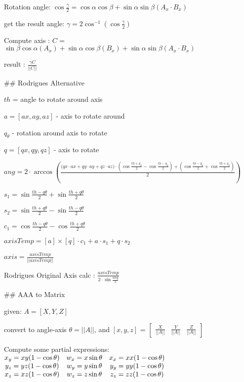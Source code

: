 Rotation angle: $\cos \frac{\gamma}{2} = \cos \alpha   \cos \beta  + \sin \alpha    \sin \beta  (  A_x \cdot B_x )$

get the result angle: $ \gamma = 2 \cos^{-1}( \cos \frac {\gamma}{2} )$


Compute axis : $C$ = $  \sin \beta  \cos \alpha  (A_x)  + \sin \alpha  \cos \beta (B_x) + \sin \alpha \sin \beta  ( A_x \cdot B_x ) $

result : $\frac {\gamma C} {||C||}$

## Rodrigues Alternative 

$th$ = angle to rotate around axis

$a = [ax,ay,az]$ - axis to rotate around

$q_{\theta}$ - rotation around axis to rotate

$ q = [qx,qy,qz]$ - axis to rotate

${ang} = 2 \cdot \arccos  ( \frac { ({{qx} \cdot {ax}+{qy}\cdot{ay}+{qz}\cdot{az})}\cdot({\cos {\frac {{th} + {q_\theta}} 2}}-{\cos {\frac {{th} - {q_\theta}} 2}}) + ( {\cos {\frac {{th} - {q_\theta}} 2}} + {\cos {\frac {{th} + {q_\theta}} 2}} ) } 2   )$

${s_1} = {\sin {\frac {{th} - {q\theta}} 2}} + {\sin {\frac {{th} + {q\theta}} 2}} $

${s_2} = {\sin {\frac {{th} + {q\theta}} 2}} - {\sin {\frac {{th} - {q\theta}} 2}} $

${c_1} = {\cos {\frac {{th} - {q\theta}} 2}} - {\cos {\frac {{th} + {q\theta}} 2}} $

${axisTemp} = {[{a}] \times [{q}]}\cdot {c_1} + {a}\cdot{s_1} + {q}\cdot{s_2} $

${axis} = \frac {axisTemp} { ||{axisTemp}|| } $

Rodrigues Original Axis calc : $\frac {axisTemp} {2 \cdot \sin  \frac {ang} 2 } $



## AAA to Matrix

given: ${A} = [X, Y ,Z] $

convert to angle-axis  $ \theta = ||A|| $, and $[x,y,z]$ = $\begin{bmatrix} \frac {X} {||A||} & \frac {Y} {||A||} &  \frac {Z} {||A||} \end{bmatrix} $


Compute some partial expressions:$\begin{matrix}
   x_y = xy(1-\cos \theta) &   w_x = x\sin \theta  &  x_x = xx(1-\cos \theta) \\
   y_z = yz(1-\cos \theta) &    w_y = y\sin \theta &  y_y = yy(1-\cos \theta) \\
   x_z = xz(1-\cos \theta) &    w_z = z\sin \theta &  z_z = zz(1-\cos \theta) 
\end{matrix}\\$


